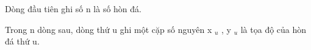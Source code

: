 Dòng đầu tiên ghi số n là số hòn đá.  

   Trong n dòng sau, dòng thứ u ghi một cặp số nguyên x   $_    u   $   , y   $_    u   $   là tọa độ của hòn đá thứ u.